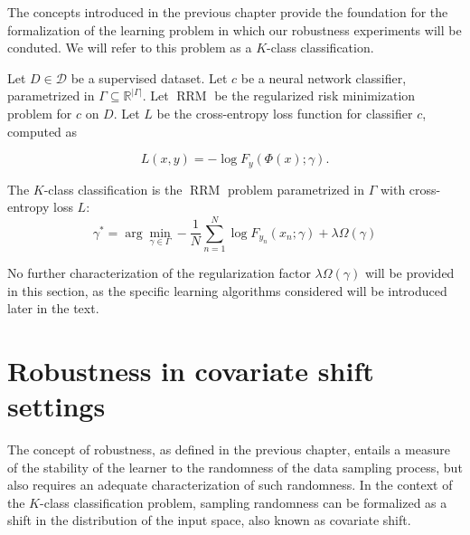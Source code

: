 The concepts introduced in the previous chapter provide the 
foundation for the formalization of the learning problem in which our 
robustness experiments will be conduted. We will refer to this 
problem as a $K$-class classification.

\begin{definition}
    Let $D \in \mathcal{D}$ be a supervised dataset.
    Let $c$ be a neural network classifier, parametrized
    in $\Gamma \subseteq \mathbb{R}^{|\Gamma|}$.
    Let $\operatorname{RRM}$ be the regularized risk minimization problem for $c$ on $D$.
    Let $L$ be the cross-entropy loss function for classifier $c$, computed as

    $$
    L(x, y) = - \log F_y(\Phi(x); \gamma).
    $$

    The $K$-class classification is the $\operatorname{RRM}$ problem parametrized in $\Gamma$
    with cross-entropy loss $L$:
    $$
        \gamma^* = \arg \min_{\gamma \in \Gamma} - \frac{1}{N}\sum_{n=1}^{N} \log F_{y_n}(x_n; \gamma) + \lambda \Omega(\gamma)
    $$

\end{definition}

No further characterization of the regularization factor $\lambda \Omega(\gamma)$ will be provided
in this section, as the specific learning algorithms considered will be introduced
later in the text.

\section{Robustness in covariate shift settings}\label{sec:robustness_to_covariate_shift}

The concept of robustness, as defined in the previous chapter, entails
a measure of the stability of the learner to the randomness of
the data sampling process, but also requires an adequate characterization
of such randomness. In the context of the $K$-class classification
problem, sampling randomness can be formalized as a shift in the
distribution of the input space, also known as covariate shift. 

